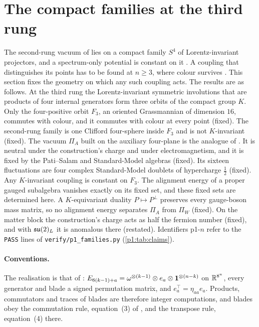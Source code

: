 \section{The compact families at the third rung}
\label{p1:sec:main}

The second-rung vacuum of \cite[Def.~26.5]{ES17} lies on a compact family $S^4$ of Lorentz-invariant projectors, and a spectrum-only
potential is constant on it \cite[Section~26]{ES17}. A coupling that distinguishes its points has to be found at $n\ge3$, where colour survives
\cite[Section~31]{ES17}. This section fixes the geometry on which any such coupling acts. The results are as follows. At the third rung the
Lorentz-invariant symmetric involutions that are products of four internal generators form three orbits of the compact group $K$. Only the
four-positive orbit $F_3$, an oriented Grassmannian of dimension $16$, commutes with colour, and it commutes with colour at every point
(fixed). The second-rung family is one Clifford four-sphere inside $F_3$ and is not $K$-invariant (fixed). The vacuum $\Pi_A$ built on the
auxiliary four-plane is the analogue of \cite[Def.~26.5]{ES17}. It is neutral under the construction's charge and under electromagnetism, and
it is fixed by the Pati--Salam and Standard-Model algebras (fixed). Its sixteen fluctuations are four complex Standard-Model doublets of
hypercharge $\tfrac12$ (fixed). Any $K$-invariant coupling is constant on $F_3$. The alignment energy of a proper gauged subalgebra vanishes
exactly on its fixed set, and these fixed sets are determined here. A $K$-equivariant duality $P\mapsto P^\perp$ preserves every gauge-boson
mass matrix, so no alignment energy separates $\Pi_A$ from $\Pi_W$ (fixed). On the matter block the construction's charge acts as half the
fermion number (fixed), and with $\mathfrak{su}(2)_L$ it is anomalous there (restated). Identifiers p1-$n$ refer to the \texttt{PASS} lines of
\texttt{verify/p1\_families.py} (\cref{p1:tab:claims}).

\paragraph{Conventions.} The realisation is that of \cite[App.~A]{ES17}: $E_{6(k-1)+a}=\omega^{\otimes(k-1)}\otimes e_a\otimes\mathbf 1^{\otimes(n-k)}$ on
$\mathbb{R}^{8^n}$, every generator and blade a signed permutation matrix, and $e_a^{\!\top}=\eta_{aa}e_a$. Products, commutators and traces of blades are therefore integer
computations, and blades obey the commutation rule, equation~(3) of \cite{ES17}, and the transpose rule, equation~(4) there.

